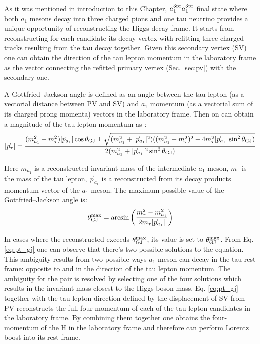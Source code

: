 As it was mentioned in introduction to this Chapter, $a_1^\text{3pr} a_1^\text{3pr}$ final state where both $a_1$ mesons decay into three charged pions and one tau neutrino provides a unique opportunity of reconstructing the Higgs decay frame. It starts from reconstructing for each \tauh candidate its decay vertex with refitting three charged tracks resulting from the tau decay together. Given this secondary vertex (SV) one can obtain the direction of the tau lepton momentum in the laboratory frame as the vector connecting the refitted primary vertex (Sec. \ref{sec:pv}) with the secondary one. 

A Gottfried–Jackson angle \gj is defined as an angle between the tau lepton (as a vectorial distance between PV and SV) and $a_1$ momentum (as a vectorial sum of its charged prong momenta) vectors in the laboratory frame. Then on can obtain a magnitude of the tau lepton momentum as \cite{Cherepanov:2018npf}:
\begin{equation}\label{eq:pt_gj}
    |\vec{p}_\tau| = \dfrac{(m^2_{a_1} + m^2_\tau)|\vec{p}_{a_1}|\cos\theta_\text{GJ} \pm \sqrt{(m^2_{a_1}+|\vec{p}_{a_1}|^2)((m^2_{a_1} - m^2_\tau)^2 - 4m^2_\tau|\vec{p}_{a_1}|\sin^2\theta_\text{GJ})}}{2(m^2_{a_1}+|\vec{p}_{a_1}|^2\sin^2\theta_\text{GJ})}
\end{equation}

Here $m_{a_1}$ is a reconstructed invariant mass of the intermediate $a_1$ meson, $m_\tau$ is the mass of the tau lepton, $\vec{p}_{a_1}$ is a reconstructed from its decay products momentum vector of the $a_1$ meson. The maximum possible value of the Gottfried–Jackson angle is:
\begin{equation}
    \theta_\text{GJ}^\text{max} = \arcsin\left(\dfrac{m_\tau^2 - m_{a_1}^2}{2m_\tau|\vec{p}_{a_1}|}\right)
\end{equation}

In cases where the reconstructed \gj exceeds $\theta_\text{GJ}^\text{max}$, its value is set to  $\theta_\text{GJ}^\text{max}$. From Eq. \ref{eq:pt_gj} one can observe that there's two possible solutions to the equation. This ambiguity results from two possible ways $a_1$ meson can decay in the tau rest frame: opposite to and in the direction of the tau lepton momentum. The ambiguity for the \aaa pair is resolved by selecting one of the four solutions which results in the invariant mass closest to the Higgs boson mass. Eq. \ref{eq:pt_gj} together with the tau lepton direction defined by the displacement of SV from PV reconstructs the full four-momentum of each of the tau lepton candidates in the laboratory frame. By combining them together one obtains the four-momentum of the H in the laboratory frame and therefore can perform Lorentz boost into its rest frame.

